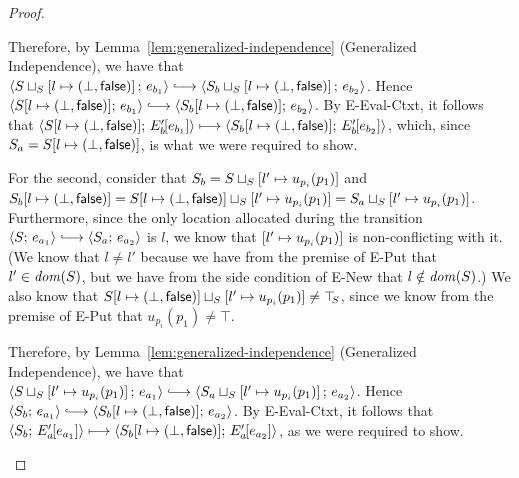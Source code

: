 \begin{proof}
\begin{enumerate}
\begin{enumerate}

      Therefore, by Lemma~\ref{lem:generalized-independence}
      (Generalized Independence), we have that
      $\config{\lubstore{S}{\store{\storebinding{l}{\bot}{\frozenfalse}}}}{e_{b_1}}
      \parstepsto
      \config{\lubstore{S_b}{\store{\storebinding{l}{\bot}{\frozenfalse}}}}{e_{b_2}}$.
      Hence $\config{\extS{S}{l}{\bot}{\frozenfalse}}{e_{b_1}}
      \parstepsto
      \config{\extS{S_b}{l}{\bot}{\frozenfalse}}{e_{b_2}}$.  By {\sc
        E-Eval-Ctxt}, it follows that
      $\langle S[l \mapsto (\bot, \textsf{false})];\, E'_b\hspace{-1mm}\left[e_{b_1}\right] \rangle
      \longmapsto
      \langle S_b[l \mapsto (\bot, \textsf{false})];\, E'_b\hspace{-1mm}\left[e_{b_2}\right] \rangle$,
      which, since $S_a = S[l \mapsto (\bot, \textsf{false})]$, is what we
      were required to show.

      For the second, consider that $S_b =
      S \sqcup_{S} \left[ l' \mapsto u_{p_i}(p_1) \right]$
      and $S_b[l \mapsto (\bot, \textsf{false})] =
      S[l \mapsto (\bot, \textsf{false})] \sqcup_{S} \left[ l' \mapsto u_{p_i}(p_1) \right]
      =
      S_a \sqcup_{S} \left[ l' \mapsto u_{p_i}(p_1) \right]$.
      Furthermore, since the only location allocated during the
      transition $\config{S}{e_{a_1}} \parstepsto
      \config{S_a}{e_{a_2}}$ is $l$, we know that
      $\left[ l' \mapsto u_{p_i}(p_1) \right]$ is
      non-conflicting with it.  (We know that $l \neq l'$ because we
      have from the premise of {\sc E-Put} that $l' \in \mathit{dom}(S)$, but
      we have from the side condition of {\sc E-New} that $l \notin
      \mathit{dom}(S)$.)  We also know that
      $S[l \mapsto (\bot, \textsf{false})] \sqcup_{S} \left[ l' \mapsto u_{p_i}(p_1) \right]
      \neq \top\hspace{-0.85mm}_{S}$, since we know from the premise of {\sc E-Put} that
      $u_{p_i}(p_1) \neq \top$.


      Therefore, by Lemma~\ref{lem:generalized-independence}
      (Generalized Independence), we have that
      $\config{\lubstore{S}{\store{\storebindingRaw{l'}{u_{p_i}(p_1)}}}}{e_{a_1}}
      \parstepsto
      \config{\lubstore{S_a}{\store{\storebindingRaw{l'}{u_{p_i}(p_1)}}}}{e_{a_2}}$.
      Hence $\config{S_b}{e_{a_1}} \parstepsto
      \config{\extS{S_b}{l}{\bot}{\frozenfalse}}{e_{a_2}}$.  By {\sc
        E-Eval-Ctxt}, it follows that
      $\langle S_b;\, E'_a\hspace{-1mm}\left[e_{a_1}\right] \rangle \longmapsto
      \langle S_b[l \mapsto (\bot, \textsf{false})];\, E'_a\hspace{-1mm}\left[e_{a_2}\right] \rangle$,
      as we were required to show.


\end{enumerate}
\end{enumerate}
\end{proof}

